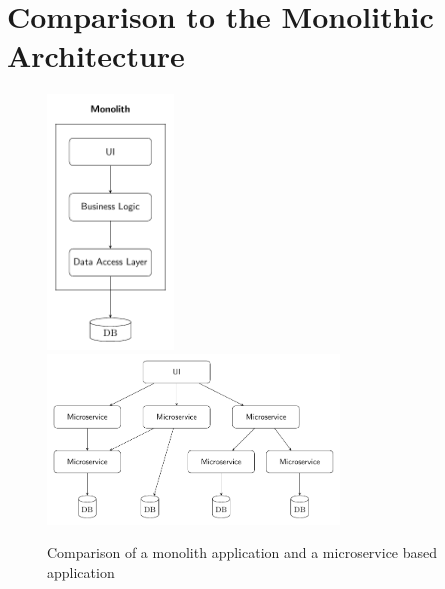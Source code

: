 \section{Comparison to the Monolithic Architecture}
\begin{figure}
    \centering
    \includegraphics[width=0.3\textwidth]{./images/microservice_architecture/TikZ_Monolith.pdf}
    \includegraphics[width=0.69\textwidth]{./images/microservice_architecture/TikZ_Microservice.pdf}
    \caption{Comparison of a monolith application and a microservice based application~\cite{kalske2017challenges}}
    \label{fig:monolithvsmicroservice}
\end{figure}

